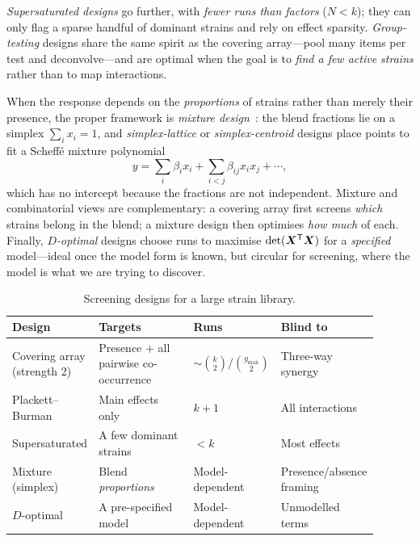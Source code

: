 \emph{Supersaturated designs} go further, with \emph{fewer runs than factors}
($N<k$); they can only flag a sparse handful of dominant strains and rely on
effect sparsity. \emph{Group-testing} designs share the same spirit as the covering
array---pool many items per test and deconvolve---and are optimal when the goal is
to \emph{find a few active strains} rather than to map interactions.

When the response depends on the \emph{proportions} of strains rather than merely
their presence, the proper framework is \emph{mixture design}~\cite{cornell}: the
blend fractions lie on a simplex $\sum_i x_i = 1$, and \emph{simplex-lattice} or
\emph{simplex-centroid} designs place points to fit a Scheff\'e mixture polynomial
%
\begin{equation}
y = \sum_i \beta_i x_i + \sum_{i<j}\beta_{ij}x_i x_j + \cdots,
\label{eq:scheffe}
\end{equation}
%
which has no intercept because the fractions are not independent. Mixture and
combinatorial views are complementary: a covering array first screens \emph{which}
strains belong in the blend; a mixture design then optimises \emph{how much} of
each. Finally, \emph{$D$-optimal} designs choose runs to maximise $\det(\bm
X^{\mathsf{T}}\bm X)$ for a \emph{specified} model---ideal once the model form is known,
but circular for screening, where the model is what we are trying to discover.

\begin{table}[h]
\centering
\renewcommand{\arraystretch}{1.35}
\caption{Screening designs for a large strain library.}
\label{tab:ferm-screen}
\begin{tabular}{@{}p{0.22\linewidth} p{0.30\linewidth} p{0.20\linewidth}
                  p{0.18\linewidth}@{}}
\toprule
\textbf{Design} & \textbf{Targets} & \textbf{Runs} & \textbf{Blind to} \\
\midrule
Covering array (strength 2) & Presence + all pairwise co-occurrence &
$\sim\binom{k}{2}/\binom{g_{\max}}{2}$ & Three-way synergy \\
Plackett--Burman & Main effects only & $k+1$ & All interactions \\
Supersaturated & A few dominant strains & $<k$ & Most effects \\
Mixture (simplex) & Blend \emph{proportions} & Model-dependent &
Presence/absence framing \\
$D$-optimal & A pre-specified model & Model-dependent & Unmodelled terms \\
\bottomrule
\end{tabular}
\end{table}

